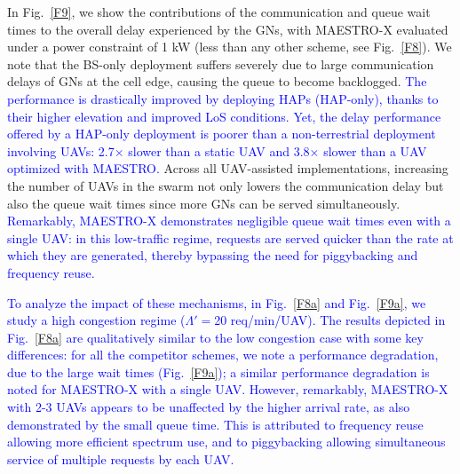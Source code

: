 \documentclass[12pt, draftcls, onecolumn]{IEEEtran}
\theoremstyle{plain}
\theoremstyle{definition}
\theoremstyle{remark}
\newcommand\hlt[1]{\textcolor{blue}{#1}}
\begin{document}
In Fig.~\ref{F9}, we show the contributions of the communication and queue wait times to the overall delay experienced by the GNs, with MAESTRO-X evaluated under a power constraint of 1 kW (less than any other scheme, see Fig.~\ref{F8}).
 We note that the BS-only deployment suffers severely due to large
communication delays of GNs at the cell edge, causing the queue to become backlogged. 
 \hlt{The performance is drastically improved by deploying HAPs (HAP-only), thanks to their 
 higher elevation and improved LoS conditions. Yet, the delay performance offered by a HAP-only deployment is poorer than a non-terrestrial deployment involving UAVs: 2.7$\times$ slower than a static UAV and 3.8$\times$ slower than a UAV optimized with MAESTRO.} 
Across all UAV-assisted implementations, %
 increasing the number of UAVs in the swarm not only lowers the communication delay but also the queue wait times since more GNs can be served simultaneously. \hlt{Remarkably, MAESTRO-X demonstrates negligible queue wait times even with a single UAV: in this low-traffic regime, requests are served quicker than the rate at which they are generated, thereby bypassing the need for piggybacking and frequency reuse.}

\hlt{To analyze the impact of these mechanisms, in Fig.~\ref{F8a} and Fig.~\ref{F9a}, we study a high congestion regime ($\Lambda'{=}$20 req/min/UAV).
The results depicted in Fig.~\ref{F8a} are qualitatively similar to the low congestion case with some key differences: for all the competitor schemes, we note a performance degradation, due to the large wait times (Fig.~\ref{F9a}); a similar performance degradation is noted
for MAESTRO-X with a single UAV.
However, remarkably, MAESTRO-X with  2-3 UAVs  appears to be unaffected by the higher arrival rate, as also demonstrated by the small queue time. This is attributed to 
 frequency reuse allowing more efficient spectrum use, and to piggybacking  allowing simultaneous service of multiple requests by each UAV.}
\end{document}
